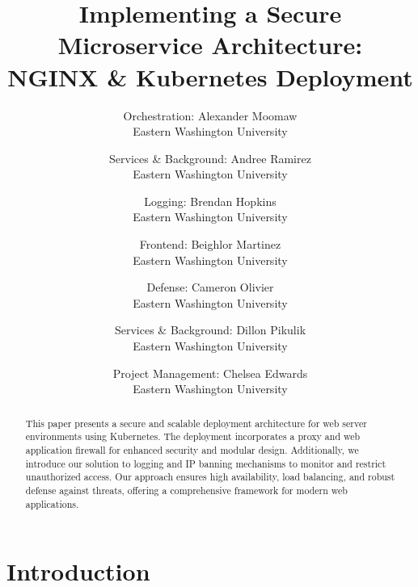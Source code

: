 \documentclass[letterpaper,twocolumn,10pt]{article}
\begin{document}

\date{}

\title{\Large \bf Implementing a Secure Microservice Architecture:\\
  NGINX \& Kubernetes Deployment}

\author{
{\rm Orchestration: Alexander Moomaw}\\
Eastern Washington University
\and
{\rm Services \& Background: Andree Ramirez}\\
Eastern Washington University
\and
{\rm Logging: Brendan Hopkins}\\
Eastern Washington University
\and
{\rm Frontend: Beighlor Martinez}\\
Eastern Washington University
\and
{\rm Defense: Cameron Olivier}\\
Eastern Washington University
\and
{\rm Services \& Background: Dillon Pikulik}\\
Eastern Washington University
\and
{\rm Project Management: Chelsea Edwards}\\
Eastern Washington University
}

\maketitle
\begin{abstract}
This paper presents a secure and scalable deployment architecture for web server environments using Kubernetes. 
The deployment incorporates a proxy and web application firewall for enhanced security and modular design. 
Additionally, we introduce our solution to logging and IP banning mechanisms to monitor and restrict unauthorized access. 
Our approach ensures high availability, load balancing, and robust defense against threats, offering a comprehensive framework for modern web applications.
\end{abstract}

\section{Introduction}

\end{document}
